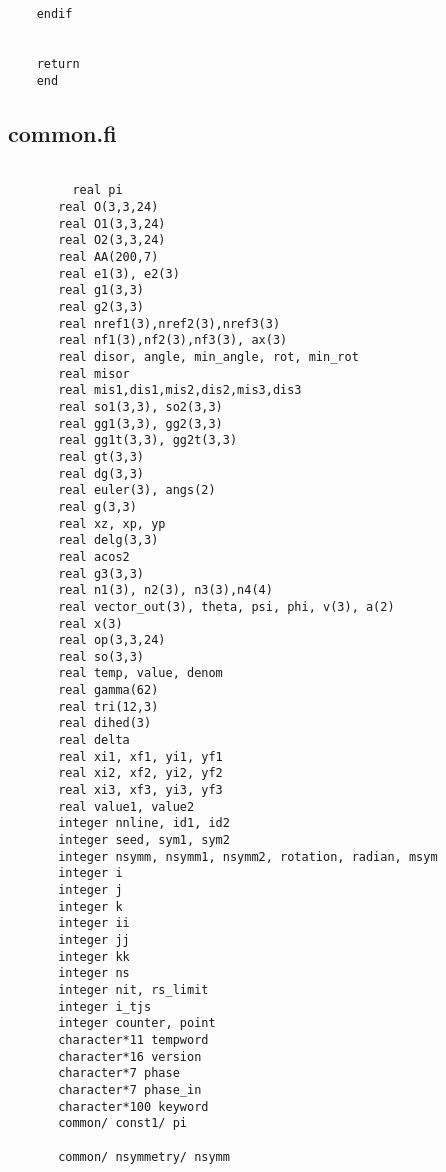 \begin{lstlisting}
      

	endif


	return
	end  
  \end{lstlisting}

\subsection{common.fi}

  \begin{lstlisting}
  
         real pi
	   real O(3,3,24)	   
	   real O1(3,3,24)	  
       real O2(3,3,24)
	   real AA(200,7)
	   real e1(3), e2(3)   
	   real g1(3,3)
	   real g2(3,3)
	   real nref1(3),nref2(3),nref3(3)
	   real nf1(3),nf2(3),nf3(3), ax(3)
	   real disor, angle, min_angle, rot, min_rot
	   real misor
	   real mis1,dis1,mis2,dis2,mis3,dis3
	   real so1(3,3), so2(3,3)
	   real gg1(3,3), gg2(3,3)   
	   real gg1t(3,3), gg2t(3,3)	   
	   real gt(3,3)
       real dg(3,3)
	   real euler(3), angs(2)
	   real g(3,3)	   
	   real xz, xp, yp
	   real delg(3,3)	   
	   real acos2	   
	   real g3(3,3)
	   real n1(3), n2(3), n3(3),n4(4)
       real vector_out(3), theta, psi, phi, v(3), a(2)
	   real x(3)
	   real op(3,3,24)
	   real so(3,3)
	   real temp, value, denom
	   real gamma(62)
	   real tri(12,3)
	   real dihed(3)
	   real delta
	   real xi1, xf1, yi1, yf1
	   real xi2, xf2, yi2, yf2
	   real xi3, xf3, yi3, yf3
       real value1, value2
	   integer nnline, id1, id2
	   integer seed, sym1, sym2
	   integer nsymm, nsymm1, nsymm2, rotation, radian, msym
	   integer i
	   integer j
	   integer k
	   integer ii
	   integer jj
	   integer kk
	   integer ns
	   integer nit, rs_limit
	   integer i_tjs
	   integer counter, point
	   character*11 tempword
	   character*16 version	   
	   character*7 phase
	   character*7 phase_in	   
	   character*100 keyword
	   common/ const1/ pi

       common/ nsymmetry/ nsymm
        
  \end{lstlisting}